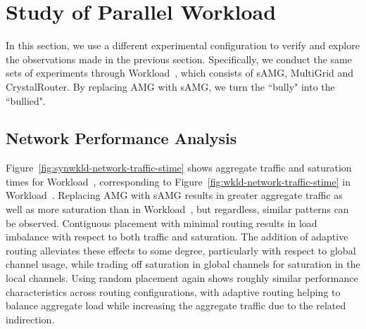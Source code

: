 
\section{Study of Parallel Workload }
\label{sec:workload-2}

In this section, we use a different experimental configuration to verify and
explore the observations made in the previous section. Specifically, we conduct
the same sets of experiments through Workload~, which consists of sAMG,
MultiGrid and CrystalRouter. By replacing AMG with sAMG, we turn the ``bully"
into the ``bullied".

\subsection{Network Performance Analysis}
\label{sec: workload-2 network analysis}

Figure~\ref{fig:synwkld-network-traffic-stime} shows aggregate traffic and
saturation times for Workload~, corresponding to
Figure~\ref{fig:wkld-network-traffic-stime} in Workload~. Replacing
AMG with sAMG results in greater aggregate traffic as well as more saturation
than in Workload~, but regardless, similar patterns can be observed.
Contiguous placement with minimal routing results in load imbalance with
respect to both traffic and saturation. The addition of adaptive routing
alleviates these effects to some degree, particularly with respect to global
channel usage, while trading off saturation in global channels for saturation in
the local channels. Using random placement again shows roughly similar performance
characteristics across routing configurations, with adaptive routing helping to
balance aggregate load while increasing the aggregate traffic due to the related
indirection.

